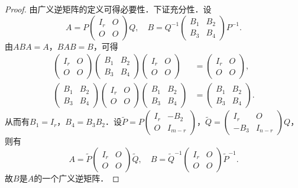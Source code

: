 \documentclass[a4paper,fontset=windows]{ctexbook}
\theoremstyle{definition}
\begin{document}
\begin{proof}
由广义逆矩阵的定义可得必要性．下证充分性．设
$$A=P\begin{pmatrix}I_r&O \\ O&O\end{pmatrix}Q,\quad B=Q^{-1}\begin{pmatrix}B_1&B_2 \\ B_3&B_4\end{pmatrix}P^{-1}.$$
由$ABA=A$，$BAB=B$，可得
\begin{align*}
\begin{pmatrix}I_r&O \\ O&O\end{pmatrix}\begin{pmatrix}B_1&B_2 \\ B_3&B_4\end{pmatrix}\begin{pmatrix}I_r&O \\ O&O\end{pmatrix}&=\begin{pmatrix}I_r&O \\ O&O\end{pmatrix}, \\
\begin{pmatrix}B_1&B_2 \\ B_3&B_4\end{pmatrix}\begin{pmatrix}I_r&O \\ O&O\end{pmatrix}\begin{pmatrix}B_1&B_2 \\ B_3&B_4\end{pmatrix}&=\begin{pmatrix}B_1&B_2 \\ B_3&B_4\end{pmatrix}.\end{align*}
从而有$B_1=I_r$，$B_4=B_3B_2$．设$\widetilde{P}=P\begin{pmatrix}I_r&-B_2 \\ O&I_{m-r}\end{pmatrix}$，$\widetilde{Q}=\begin{pmatrix}I_r&O \\ -B_3&I_{n-r}\end{pmatrix}Q$，则有
$$A=\widetilde{P}\begin{pmatrix}I_r&O \\ O&O\end{pmatrix}\widetilde{Q}, \quad
B=\widetilde{Q}^{-1}\begin{pmatrix}I_r&O \\ O&O\end{pmatrix}\widetilde{P}^{-1}.$$
故$B$是$A$的一个广义逆矩阵．
\end{proof}
\end{document}
